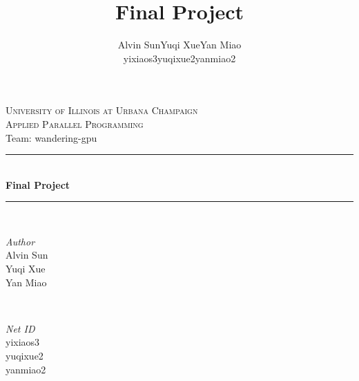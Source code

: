 \documentclass{article}
\def\fp{Final Project}
\begin{document}
\title{\fp}
\date{} %
\author{
\begin{tabular}{ccc}
    Alvin Sun & Yuqi Xue & Yan Miao \tabularnewline
    yixiaos3 & yuqixue2 & yanmiao2
\end{tabular}
}

\begin{titlepage} %
	\newcommand{\HRule}{\rule{\linewidth}{0.5mm}} %

	\center %


	\textsc{\LARGE University of Illinois at Urbana Champaign}\\[1.5cm] %

	\textsc{\Large Applied Parallel Programming}\\[0.5cm] %

	\large Team: wandering-gpu \\[0.5cm] %


	\HRule\\[0.4cm]

	{\huge\bfseries Final Project}\\[0.4cm] %

	\HRule\\[1.5cm]


	\begin{minipage}{0.4\textwidth}
		\begin{flushleft}
			\large
			\textit{Author}\\
			Alvin Sun \\ %
            Yuqi Xue  \\
            Yan Miao
		\end{flushleft}
	\end{minipage}
	~
	\begin{minipage}{0.4\textwidth}
		\begin{flushright}
			\large
			\textit{Net ID}\\
			yixiaos3 \\ %
            yuqixue2 \\
            yanmiao2
		\end{flushright}
	\end{minipage}


\end{titlepage}
\end{document}

